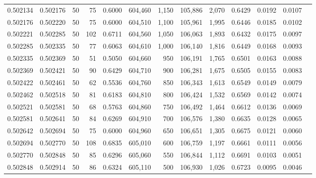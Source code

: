 \begin{tabular}{rrrrrrrrrrrrr}
0.502134 & 0.502176 &    50 &  75 &                                     0.6000 & 604,460 &   1,150 & 105,886 &   2,070 & 0.6429 & 0.0192 & 0.0107 \\
0.502176 & 0.502220 &    50 &  75 &                                     0.6000 & 604,510 &   1,100 & 105,961 &   1,995 & 0.6446 & 0.0185 & 0.0102 \\
0.502221 & 0.502285 &    50 & 102 &                                     0.6711 & 604,560 &   1,050 & 106,063 &   1,893 & 0.6432 & 0.0175 & 0.0097 \\
0.502285 & 0.502335 &    50 &  77 &                                     0.6063 & 604,610 &   1,000 & 106,140 &   1,816 & 0.6449 & 0.0168 & 0.0093 \\
0.502335 & 0.502369 &    50 &  51 &                                     0.5050 & 604,660 &     950 & 106,191 &   1,765 & 0.6501 & 0.0163 & 0.0088 \\
0.502369 & 0.502421 &    50 &  90 &                                     0.6429 & 604,710 &     900 & 106,281 &   1,675 & 0.6505 & 0.0155 & 0.0083 \\
0.502422 & 0.502461 &    50 &  62 &                                     0.5536 & 604,760 &     850 & 106,343 &   1,613 & 0.6549 & 0.0149 & 0.0079 \\
0.502462 & 0.502518 &    50 &  81 &                                     0.6183 & 604,810 &     800 & 106,424 &   1,532 & 0.6569 & 0.0142 & 0.0074 \\
0.502521 & 0.502581 &    50 &  68 &                                     0.5763 & 604,860 &     750 & 106,492 &   1,464 & 0.6612 & 0.0136 & 0.0069 \\
0.502581 & 0.502641 &    50 &  84 &                                     0.6269 & 604,910 &     700 & 106,576 &   1,380 & 0.6635 & 0.0128 & 0.0065 \\
0.502642 & 0.502694 &    50 &  75 &                                     0.6000 & 604,960 &     650 & 106,651 &   1,305 & 0.6675 & 0.0121 & 0.0060 \\
0.502694 & 0.502770 &    50 & 108 &                                     0.6835 & 605,010 &     600 & 106,759 &   1,197 & 0.6661 & 0.0111 & 0.0056 \\
0.502770 & 0.502848 &    50 &  85 &                                     0.6296 & 605,060 &     550 & 106,844 &   1,112 & 0.6691 & 0.0103 & 0.0051 \\
0.502848 & 0.502914 &    50 &  86 &                                     0.6324 & 605,110 &     500 & 106,930 &   1,026 & 0.6723 & 0.0095 & 0.0046 \\

\end{tabular}

